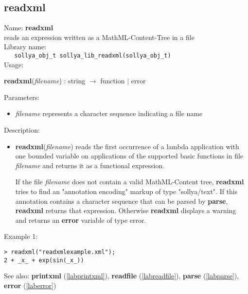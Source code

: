 \subsection{readxml}
\label{labreadxml}
\noindent Name: \textbf{readxml}\\
\phantom{aaa}reads an expression written as a MathML-Content-Tree in a file\\[0.2cm]
\noindent Library name:\\
\verb|   sollya_obj_t sollya_lib_readxml(sollya_obj_t)|\\[0.2cm]
\noindent Usage: 
\begin{center}
\textbf{readxml}(\emph{filename}) : \textsf{string} $\rightarrow$ \textsf{function} $|$ \textsf{error}\\
\end{center}
Parameters: 
\begin{itemize}
\item \emph{filename} represents a character sequence indicating a file name
\end{itemize}
\noindent Description: \begin{itemize}

\item \textbf{readxml}(\emph{filename}) reads the first occurrence of a lambda
   application with one bounded variable on applications of the supported
   basic functions in file \emph{filename} and returns it as a \sollya
   functional expression.
    
   If the file \emph{filename} does not contain a valid MathML-Content tree,
   \textbf{readxml} tries to find an "annotation encoding" markup of type
   "sollya/text". If this annotation contains a character sequence
   that can be parsed by \textbf{parse}, \textbf{readxml} returns that expression.  Otherwise
   \textbf{readxml} displays a warning and returns an \textbf{error} variable of type
   \textsf{error}.
\end{itemize}
\noindent Example 1: 
\begin{center}\begin{minipage}{15cm}\begin{Verbatim}[frame=single,commandchars=\\\|\~]
> readxml("readxmlexample.xml");
2 + _x_ + exp(sin(_x_))
\end{Verbatim}
\end{minipage}\end{center}
See also: \textbf{printxml} (\ref{labprintxml}), \textbf{readfile} (\ref{labreadfile}), \textbf{parse} (\ref{labparse}), \textbf{error} (\ref{laberror})
